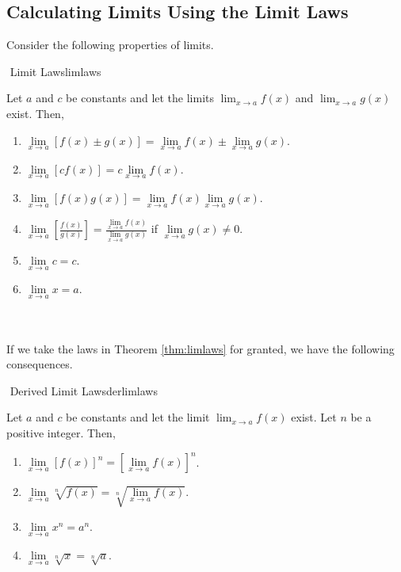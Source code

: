    \subsection{Calculating Limits Using the Limit Laws}

        Consider the following properties of limits.
        \begin{theorem}{\Stop\,\,Limit Laws}{limlaws}

            Let \(a\) and \(c\) be constants and let the limits \(\lim_{x\to a}f(x)\) and \(\lim_{x\to a}g(x)\) exist. Then,
            \begin{enumerate}
                \item \(\lim\limits_{x\to a}[f(x)\pm g(x)]=\lim\limits_{x\to a}f(x)\pm\lim\limits_{x\to a}g(x)\).
                \item \(\lim\limits_{x\to a}[cf(x)]=c\lim\limits_{x\to a}f(x)\).
                \item \(\lim\limits_{x\to a}[f(x)g(x)]=\lim\limits_{x\to a}f(x)\lim\limits_{x\to a}g(x)\).
                \item \(\lim\limits_{x\to a}\left[\frac{f(x)}{g(x)}\right]=\frac{\lim\limits_{x\to a}f(x)}{\lim\limits_{x\to a}g(x)}\) if \(\lim\limits_{x\to a}g(x)\neq0\).
                \item \(\lim\limits_{x\to a}c=c\).
                \item \(\lim\limits_{x\to a}x=a\).
            \end{enumerate}
            
        \end{theorem}
        \vphantom
        \\
        \\
        If we take the laws in Theorem \ref{thm:limlaws} for granted, we have the following consequences.
        \begin{theorem}{\Stop\,\,Derived Limit Laws}{derlimlaws}

            Let \(a\) and \(c\) be constants and let the limit \(\lim_{x\to a}f(x)\) exist. Let \(n\) be a positive integer. Then,
            \begin{enumerate}
                \item \(\lim\limits_{x\to a}[f(x)]^n=\left[\lim\limits_{x\to a}f(x)\right]^n\).
                \item \(\lim\limits_{x\to a}\sqrt[n]{f(x)}=\sqrt[n]{\lim\limits_{x\to a}f(x)}\).
                \item \(\lim\limits_{x\to a}x^n=a^n\).
                \item \(\lim\limits_{x\to a}\sqrt[n]{x}=\sqrt[n]{a}\).
            \end{enumerate}
            
        \end{theorem}

